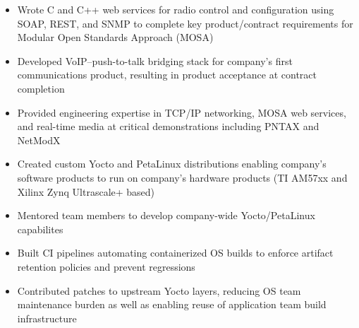 \begin{itemize}
    \item Wrote C and C++ web services for radio control and configuration using SOAP, REST, and SNMP to complete key product/contract requirements for Modular Open Standards Approach (MOSA)
    \item Developed VoIP--push-to-talk bridging stack for company's first communications product, resulting in product acceptance at contract completion
    \item Provided engineering expertise in TCP/IP networking, MOSA web services, and real-time media at critical demonstrations including PNTAX and NetModX
    \item Created custom Yocto and PetaLinux distributions enabling company's software products to run on company's hardware products (TI AM57xx and Xilinx Zynq Ultrascale+ based)
    \item Mentored team members to develop company-wide Yocto/PetaLinux capabilites
    \item Built CI pipelines automating containerized OS builds to enforce artifact retention policies and prevent regressions
    \item Contributed patches to upstream Yocto layers, reducing OS team maintenance burden as well as enabling reuse of application team build infrastructure
\end{itemize}

